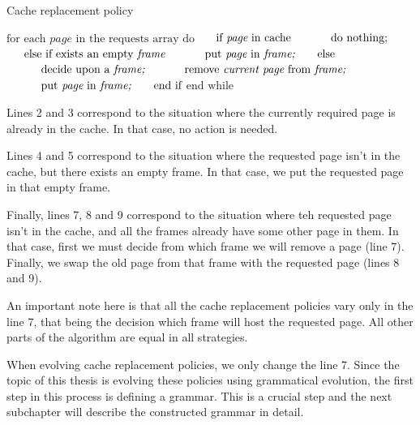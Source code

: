 \begin{algorithm}[]
\caption{Cache replacement policy}
\begin{algorithmic}[1]
\State $\text{for each } \textit{page} \text{ in the requests array do}$
\State $\indent \text{if } \textit{page} \text{ in cache} $
\State $\indent \indent \text{do nothing;} $
\State $\indent \text{else if exists an empty } \textit{frame} $
\State $\indent \indent \text{put } \textit{page} \text{ in } \textit{frame;} $
\State $\indent \text{else} $
\State $\indent \indent \text{decide upon a } \textit{frame;}$
\State $\indent \indent \text{remove } \textit{current page} 
\text{ from } \textit{frame;}$
\State $\indent \indent \text{put } \textit{page} \text{ in } \textit{frame;} $
\State $\indent \text{end if}$
\State $\text{end while}$
\end{algorithmic}
\end{algorithm}

Lines 2 and 3 correspond to the situation where the currently required page is already in the cache. In that case, no action is needed.

Lines 4 and 5 correspond to the situation where the requested page isn't in the cache, but there exists an empty frame. In that case, we put the requested page in that empty frame.

Finally, lines 7, 8 and 9 correspond to the situation where teh requested page isn't in the cache, and all the frames already have some other page in them. In that case, first we must decide from which frame we will remove a page (line 7). Finally, we swap the old page from that frame with the requested page (lines 8 and 9).

An important note here is that all the cache replacement policies vary only in the line 7, that being the decision which frame will host the requested page. All other parts of the algorithm are equal in all strategies. 

When evolving cache replacement policies, we only change the line 7. Since the topic of this thesis is evolving these policies using grammatical evolution, the first step in this process is defining a grammar. This is a crucial step and the next subchapter will describe the constructed grammar in detail.